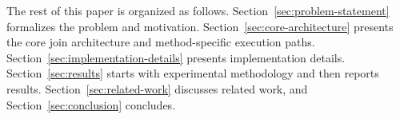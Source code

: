 The rest of this paper is organized as follows. Section~\ref{sec:problem-statement} formalizes the problem and motivation. Section~\ref{sec:core-architecture} presents the core join architecture and method-specific execution paths. Section~\ref{sec:implementation-details} presents implementation details. Section~\ref{sec:results} starts with experimental methodology and then reports results. Section~\ref{sec:related-work} discusses related work, and Section~\ref{sec:conclusion} concludes.


